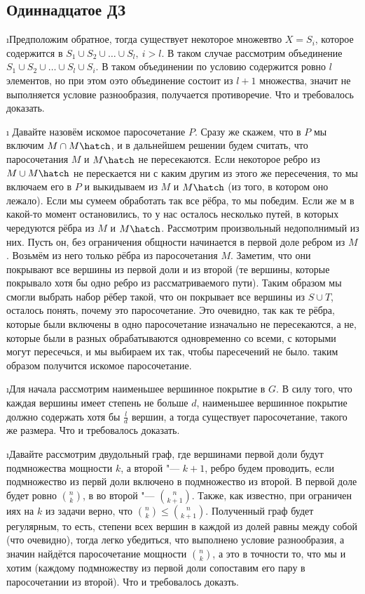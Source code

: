 \subsection{Одиннадцатое ДЗ}


\i Предположим обратное, тогда существует некоторое множевтво $X = S_i$, которое содержится в $S_1 \cup S_2 \cup \ldots \cup S_l, \ i > l$. В таком случае рассмотрим объединение $S_1 \cup S_2 \cup \ldots \cup S_l \cup S_i$. В таком объединении по условию содержится ровно $l$ элементов, но при этом оэто объединение состоит из $l+1$ множества, значит не выполняется условие разнообразия, получается противоречие. Что и требовалось доказать.

\i \label{prob.2} Давайте назовём искомое паросочетание $P$. Сразу же скажем, что в $P$ мы включим $M \cap M\hatch$, и в дальнейшем решении будем считать, что паросочетания $M$ и $M\hatch$ не пересекаются. Если некоторое ребро из $M \cup M\hatch$ не перескается ни с каким другим из этого же пересечения, то мы включаем его в $P$ и выкидываем из $M$ и $M\hatch$ (из того, в котором оно лежало). Если мы сумеем обработать так все рёбра, то мы победим. Если же м в какой-то момент остановились, то у нас осталось несколько путей, в которых чередуются рёбра из $M$ и $M\hatch$. Рассмотрим произвольный недополнимый из них. Пусть он, без ограничения общности начинается в первой доле ребром из $M$. Возьмём из него только рёбра из паросочетания $M$. Заметим, что они покрывают все вершины из первой доли и из второй (те вершины, которые покрывало хотя бы одно ребро из рассматриваемого пути). Таким образом мы смогли выбрать набор рёбер такой, что он покрывает все вершины из $S \cup T$, осталось понять, почему это паросочетание. Это очевидно, так как те рёбра, которые были включены в одно паросочетание изначально не пересекаются, а не, которые были в разных обрабатываются одновременно со всеми, с которыми могут пересечься, и мы выбираем их так, чтобы паресечений не было. таким образом получится искомое паросочетание.

\i Для начала рассмотрим наименьшее вершинное покрытие в $G$. В силу того, что каждая вершины имеет степень не больше $d$, наименьшее вершинное покрытие должно содержать хотя бы $\frac{l}{d}$ вершин, а тогда существует паросочетание, такого же размера. Что и требовалось доказать.

\i Давайте рассмотрим двудольный граф, где вершинами первой доли будут подмножества мощности $k$, а второй "--- $k+1$, ребро будем проводить, если подмножество из первй доли включено в подмножество из второй. В первой доле будет ровно $\binom{n}{k}$, в во второй "--- $\binom{n}{k+1}$. Также, как известно, при ограничен иях на $k$ из задачи верно, что $\binom{n}{k} \leq \binom{n}{k+1}$. Полученный граф будет регулярным, то есть, степени всех вершин в каждой из долей равны между собой (что очевидно), тогда легко убедиться, что выполнено условие разнообразия, а значин найдётся паросочетание мощности $\binom{n}{k}$, а это в точности то, что мы и хотим (каждому подмножеству из первой доли сопоставим его пару в паросочетании из второй). Что и требовалось доказть.

